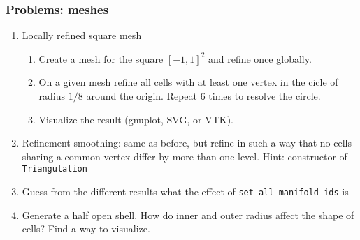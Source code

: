 \begin{frame}
  \frametitle{Problems: meshes}
  \begin{enumerate}
    \item Locally refined square mesh
    \begin{enumerate}
    \item Create a mesh for the square $[-1,1]^2$ and refine once globally.
    \item On a given mesh refine all cells with at least one vertex in
      the cicle of radius $1/8$ around the origin. Repeat 6 times to
      resolve the circle.
    \item Visualize the result (gnuplot, SVG, or VTK).
    \end{enumerate}
  \item Refinement smoothing: same as before, but refine in such a way
    that no cells sharing a common vertex differ by more than one
    level. Hint: constructor of \lstinline!Triangulation!
  \item Guess from the different results what the effect of
    \lstinline!set_all_manifold_ids! is
  \item Generate a half open shell. How do inner and outer radius
    affect the shape of cells? Find a way to visualize.
  \end{enumerate}
\end{frame}
